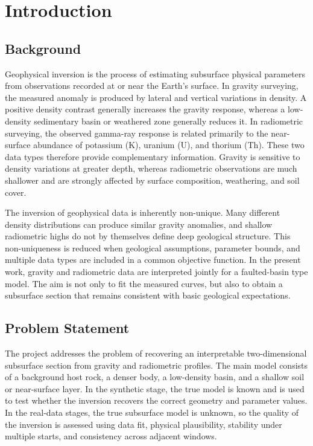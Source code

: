 \documentclass[12pt,a4paper]{article}
\begin{document}
\section{Introduction}
\subsection{Background}
Geophysical inversion is the process of estimating subsurface physical parameters from observations recorded at or near the Earth's surface. In gravity surveying, the measured anomaly is produced by lateral and vertical variations in density. A positive density contrast generally increases the gravity response, whereas a low-density sedimentary basin or weathered zone generally reduces it. In radiometric surveying, the observed gamma-ray response is related primarily to the near-surface abundance of potassium (K), uranium (U), and thorium (Th). These two data types therefore provide complementary information. Gravity is sensitive to density variations at greater depth, whereas radiometric observations are much shallower and are strongly affected by surface composition, weathering, and soil cover.

The inversion of geophysical data is inherently non-unique. Many different density distributions can produce similar gravity anomalies, and shallow radiometric highs do not by themselves define deep geological structure. This non-uniqueness is reduced when geological assumptions, parameter bounds, and multiple data types are included in a common objective function. In the present work, gravity and radiometric data are interpreted jointly for a faulted-basin type model. The aim is not only to fit the measured curves, but also to obtain a subsurface section that remains consistent with basic geological expectations.

\subsection{Problem Statement}
The project addresses the problem of recovering an interpretable two-dimensional subsurface section from gravity and radiometric profiles. The main model consists of a background host rock, a denser body, a low-density basin, and a shallow soil or near-surface layer. In the synthetic stage, the true model is known and is used to test whether the inversion recovers the correct geometry and parameter values. In the real-data stages, the true subsurface model is unknown, so the quality of the inversion is assessed using data fit, physical plausibility, stability under multiple starts, and consistency across adjacent windows.
\end{document}

